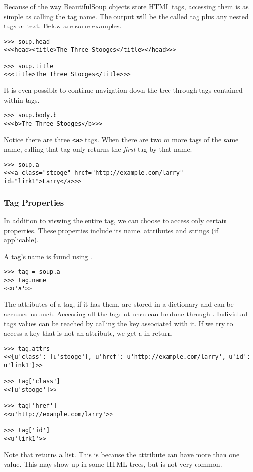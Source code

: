 Because of the way BeautifulSoup objects store HTML tags, accessing them is as simple as calling the tag name.
The output will be the called tag plus any nested tags or text.
Below are some examples.
\begin{lstlisting}
>>> soup.head
<<<head><title>The Three Stooges</title></head>>>

>>> soup.title
<<<title>The Three Stooges</title>>>
\end{lstlisting}
It is even possible to continue navigation down the tree through tags contained within tags.
\begin{lstlisting}
>>> soup.body.b
<<<b>The Three Stooges</b>>>
\end{lstlisting}
Notice there are three \lstinline{<a>} tags.
When there are two or more tags of the same name, calling that tag only returns the \textit{first} tag by that name.
\begin{lstlisting}
>>> soup.a
<<<a class="stooge" href="http://example.com/larry" id="link1">Larry</a>>>
\end{lstlisting}

\subsubsection{Tag Properties}

In addition to viewing the entire tag, we can choose to access only certain properties.
These properties include its name, attributes and strings (if applicable).

A tag's name is found using .
\begin{lstlisting}
>>> tag = soup.a
>>> tag.name
<<u'a'>>
\end{lstlisting}

The attributes of a tag, if it has them, are stored in a dictionary and can be accessed as such.
Accessing all the tags at once can be done through .
Individual tags values can be reached by calling the key associated with it.
If we try to access a key that is not an attribute, we get a  in return.
\begin{lstlisting}
>>> tag.attrs
<<{u'class': [u'stooge'], u'href': u'http://example.com/larry', u'id': u'link1'}>>

>>> tag['class']
<<[u'stooge']>>

>>> tag['href']
<<u'http://example.com/larry'>>

>>> tag['id']
<<u'link1'>>
\end{lstlisting}
Note that  returns a list.
This is because the  attribute can have more than one value.
This may show up in some HTML trees, but is not very common.

